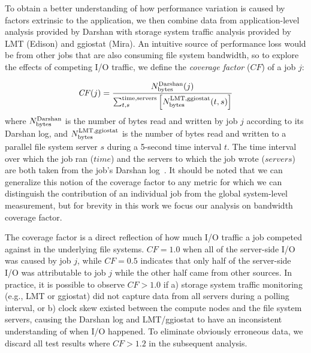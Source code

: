 To obtain a better understanding of how performance variation is caused by factors extrinsic to the application, we then combine data from application-level analysis provided by Darshan with storage system traffic analysis provided by LMT (Edison) and ggiostat (Mira).
An intuitive source of performance loss would be from other jobs that are also consuming file system bandwidth, so to explore the effects of competing I/O traffic, we define the \emph{coverage factor} ($\mathit{CF}$) of a job $j$:

\begin{equation} \label{eq:cf}
    \mathit{CF}(j) = \frac{N_{\textup{bytes}}^{\textup{Darshan}}(j)}
    {\sum_{t,s}^{\textup{time,servers}}
    \left [ N_{\textup{bytes}}^{\textup{LMT,ggiostat}}(t,s) \right ] }
\end{equation}
%
where $N_{\textup{bytes}}^{\textup{Darshan}}$ is the number of bytes read and written by job $j$ according to its Darshan log, and $N_{\textup{bytes}}^{\textup{LMT,ggiostat}}$ is the number of bytes read and written to a parallel file system server $s$ during a 5-second time interval $t$.
The time interval over which the job ran ($\mathit{time}$) and the servers to
which the job wrote ($\mathit{servers}$) are both taken from the job's
Darshan log~\cite{snyder2016modular}.  It should be noted that we can
generalize this notion of the coverage factor to any metric for which we can
distinguish the contribution of an individual job from the global
system-level measurement, but for brevity in this work we focus our analysis
on bandwidth coverage factor.

The coverage factor is a direct reflection of how much I/O traffic a job competed against in the underlying file systems.
$\mathit{CF} = 1.0$ when all of the server-side I/O was caused by job $j$, while $\mathit{CF} = 0.5$ indicates that only half of the server-side I/O was attributable to job $j$ while the other half came from other sources.
In practice, it is possible to observe $\mathit{CF} > 1.0$ if
a) storage system traffic monitoring (e.g., LMT or ggiostat) did not capture data from all servers during a polling interval, or
b) clock skew existed between the compute nodes and the file system servers, causing the Darshan log and LMT/ggiostat to have an inconsistent understanding of when I/O happened.
To eliminate obviously erroneous data, we discard all test results where $\mathit{CF} > 1.2$ in the subsequent analysis.

